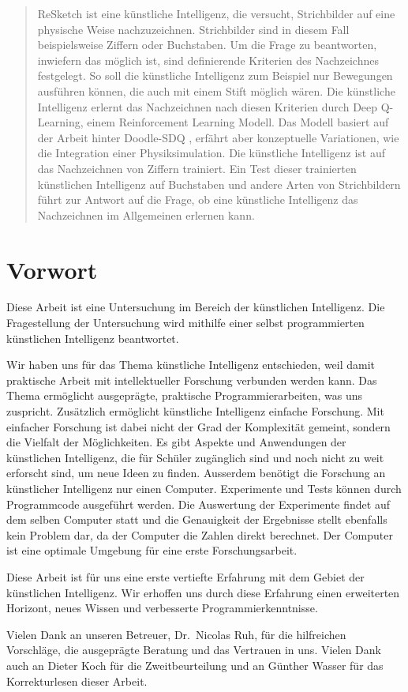 \begin{abstract}\label{abstract} ReSketch ist eine künstliche Intelligenz, die
versucht, Strichbilder auf eine physische Weise nachzuzeichnen. Strichbilder
sind in diesem Fall beispielsweise Ziffern oder Buchstaben. Um die Frage zu
beantworten, inwiefern das möglich ist, sind definierende Kriterien des
Nachzeichnes festgelegt. So soll die künstliche Intelligenz zum Beispiel nur
Bewegungen ausführen können, die auch mit einem Stift möglich wären. Die
künstliche Intelligenz erlernt das Nachzeichnen nach diesen Kriterien durch Deep
Q-Learning, einem Reinforcement Learning Modell. Das Modell basiert auf der
Arbeit hinter Doodle-SDQ \cite{zhou_learning_2018}, erfährt aber konzeptuelle
Variationen, wie die Integration einer Physiksimulation. Die künstliche
Intelligenz ist auf das Nachzeichnen von Ziffern trainiert. Ein Test dieser
trainierten künstlichen Intelligenz auf Buchstaben und andere Arten von
Strichbildern führt zur Antwort auf die Frage, ob eine künstliche Intelligenz
das Nachzeichnen im Allgemeinen erlernen kann.
\end{abstract}

\newpage

\section*{Vorwort}\label{vorwort} Diese Arbeit ist eine Untersuchung im Bereich
der künstlichen Intelligenz. Die Fragestellung der Untersuchung wird mithilfe
einer selbst programmierten künstlichen Intelligenz beantwortet. 

Wir haben uns für das Thema künstliche Intelligenz entschieden, weil damit
praktische Arbeit mit intellektueller Forschung verbunden werden kann. Das Thema
ermöglicht ausgeprägte, praktische Programmierarbeiten, was uns zuspricht.
Zusätzlich ermöglicht künstliche Intelligenz einfache Forschung. Mit einfacher
Forschung ist dabei nicht der Grad der Komplexität gemeint, sondern die Vielfalt
der Möglichkeiten. Es gibt Aspekte und Anwendungen der künstlichen Intelligenz,
die für Schüler zugänglich sind und noch nicht zu weit erforscht sind, um neue
Ideen zu finden. Ausserdem benötigt die Forschung an künstlicher Intelligenz nur
einen Computer. Experimente und Tests können durch Programmcode ausgeführt
werden. Die Auswertung der Experimente findet auf dem selben Computer statt und
die Genauigkeit der Ergebnisse stellt ebenfalls kein Problem dar, da der
Computer die Zahlen direkt berechnet. Der Computer ist eine optimale Umgebung
für eine erste Forschungsarbeit.

Diese Arbeit ist für uns eine erste vertiefte Erfahrung mit dem Gebiet der
künstlichen Intelligenz. Wir erhoffen uns durch diese Erfahrung einen
erweiterten Horizont, neues Wissen und verbesserte Programmierkenntnisse.

Vielen Dank an unseren Betreuer, Dr.\ Nicolas Ruh, für die hilfreichen
Vorschläge, die ausgeprägte Beratung und das Vertrauen in uns. Vielen Dank auch
an Dieter Koch für die Zweitbeurteilung und an Günther Wasser für das
Korrekturlesen dieser Arbeit.
